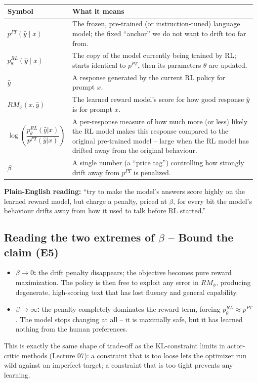 \documentclass[11pt]{article}
\begin{document}
\begin{center}
\begin{longtable}{|>{\raggedright\arraybackslash}p{3.2cm}|>{\raggedright\arraybackslash}p{10.3cm}|}
\hline
\textbf{Symbol} & \textbf{What it means} \\
\hline
$p^{PT}(\hat y \mid x)$ & The frozen, pre-trained (or instruction-tuned) language
model; the fixed ``anchor'' we do not want to drift too far from. \\
\hline
$p^{RL}_\theta(\hat y \mid x)$ & The copy of the model currently being trained by
RL; starts identical to $p^{PT}$, then its parameters $\theta$ are updated. \\
\hline
$\hat y$ & A response generated by the current RL policy for prompt $x$. \\
\hline
$RM_\phi(x,\hat y)$ & The learned reward model's score for how good response
$\hat y$ is for prompt $x$. \\
\hline
$\log\left(\dfrac{p^{RL}_\theta(\hat y|x)}{p^{PT}(\hat y|x)}\right)$ & A per-response
measure of how much more (or less) likely the RL model makes this response
compared to the original pre-trained model -- large when the RL model has drifted
away from the original behaviour. \\
\hline
$\beta$ & A single number (a ``price tag'') controlling how strongly drift away
from $p^{PT}$ is penalized. \\
\hline
\end{longtable}
\end{center}
\textbf{Plain-English reading:} ``try to make the model's answers score highly on
the learned reward model, but charge a penalty, priced at $\beta$, for every bit
the model's behaviour drifts away from how it used to talk before RL started.''

\subsection{Reading the two extremes of $\beta$ -- Bound the claim (E5)}
\begin{itemize}
  \item \textbf{$\beta \to 0$:} the drift penalty disappears; the objective
  becomes pure reward maximization. The policy is then free to exploit any error
  in $RM_\phi$, producing degenerate, high-scoring text that has lost fluency and
  general capability.
  \item \textbf{$\beta \to \infty$:} the penalty completely dominates the reward
  term, forcing $p^{RL}_\theta \approx p^{PT}$. The model stops changing at all --
  it is maximally safe, but it has learned nothing from the human preferences.
\end{itemize}
This is exactly the same shape of trade-off as the KL-constraint limits in
actor-critic methods (Lecture 07): a constraint that is too loose lets the
optimizer run wild against an imperfect target; a constraint that is too tight
prevents any learning.
\end{document}
